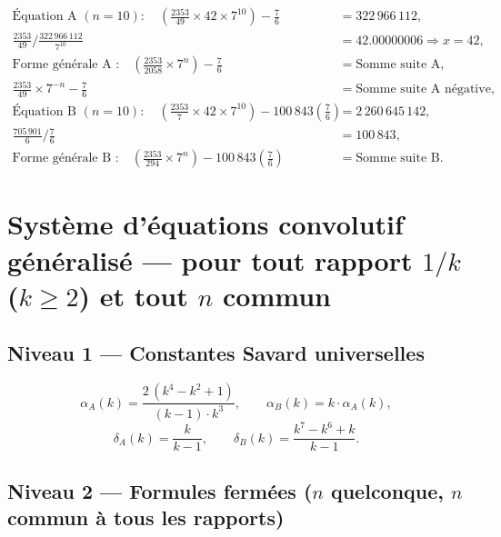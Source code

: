 \documentclass[11pt,a4paper]{article}
\begin{document}
\begin{boitenote}
\begin{boitenote}[Inspiration]
\begin{boitenote}
\vspace{0.3cm}
\begin{boiteformule}
\begin{align*}
\text{Équation A }(n=10):\quad
\left(\frac{2353}{49}\times42\times7^{10}\right)-\frac{7}{6}
&=322\,966\,112,\\
\frac{2353}{49}\Big/\frac{322\,966\,112}{7^{10}}
&=42.00000006\Rightarrow x=42,\\
\text{Forme générale A :}\quad
\left(\frac{2353}{2058}\times7^{n}\right)-\frac{7}{6}
&=\text{Somme suite A},\\
\frac{2353}{49}\times7^{-n}-\frac{7}{6}
&=\text{Somme suite A négative},\\
\text{Équation B }(n=10):\quad
\left(\frac{2353}{7}\times42\times7^{10}\right)
-100\,843\left(\frac{7}{6}\right)
&=2\,260\,645\,142,\\
\frac{705\,901}{6}\Big/\frac{7}{6} &=100\,843,\\
\text{Forme générale B :}\quad
\left(\frac{2353}{294}\times7^{n}\right)
-100\,843\left(\frac{7}{6}\right)
&=\text{Somme suite B}.
\end{align*}
\end{boiteformule}

\section{Système d'équations convolutif généralisé --- pour tout rapport $1/k$ ($k \ge 2$) et tout $n$ commun}

\subsection{Niveau 1 --- Constantes Savard universelles}

\vspace{0.3cm}
\begin{boiteformule}
\[
\alpha_A(k) = \frac{2\,(k^{4} - k^{2} + 1)}{(k-1)\cdot k^{3}},
\qquad
\alpha_B(k) = k \cdot \alpha_A(k),
\]
\[
\delta_A(k) = \frac{k}{k-1},
\qquad
\delta_B(k) = \frac{k^{7} - k^{6} + k}{k-1}.
\]
\end{boiteformule}

\subsection{Niveau 2 --- Formules fermées ($n$ quelconque, $n$ commun à tous les rapports)}


\end{boitenote}
\end{boitenote}
\end{boitenote}
\end{document}
